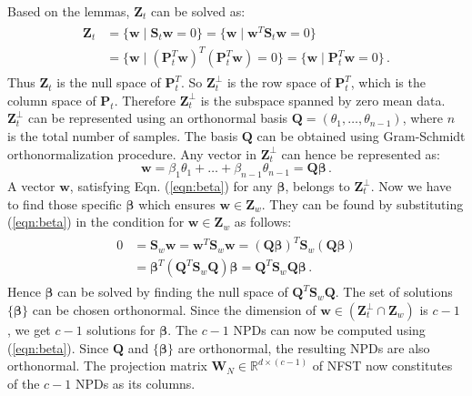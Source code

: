 \documentclass[runningheads]{llncs}
\begin{document}
Based on the lemmas, $\mathbf{Z}_t$ can be solved as:
\begin{eqnarray}
\begin{aligned}
\mathbf{Z}_t  &= \lbrace  \mathbf{w}  \; \vert \;  \mathbf{S}_t \mathbf{w} = 0\rbrace = \lbrace  \mathbf{w} \; \vert \;  \mathbf{w}^T \mathbf{S}_t \mathbf{w} = 0\rbrace \\
&= \lbrace  \mathbf{w} \; \vert \;  (\mathbf{P}_t^T \mathbf{w})^T (\mathbf{P}_t^T \mathbf{w})  = 0\rbrace = \lbrace  \mathbf{w} \; \vert \;  \mathbf{P}_t^T \mathbf{w}  = 0\rbrace \,.
\end{aligned}
\end{eqnarray}
Thus $\mathbf{Z}_t$ is the null space of $\mathbf{P}_t^T$. So $\mathbf{Z}^\perp_t$ is the row space of $\mathbf{P}_t^T$, which is the column space of $\mathbf{P}_t$. Therefore $\mathbf{Z}^\perp_t$ is the subspace spanned by zero mean data. $\mathbf{Z}^\perp_t$ can be represented using an orthonormal basis $\mathbf{Q} = (\theta_1,\ldots, \theta_{n-1})$, where $n$ is the total number of samples. The basis $\mathbf{Q}$ can be obtained using Gram-Schmidt orthonormalization procedure. Any vector in $\mathbf{Z}^\perp_t$ can hence be represented as: 
\begin{equation}
\label{eqn:beta}
\mathbf{w} = \beta_1 \theta_1 + \ldots + \beta_{n-1} \theta_{n-1} = \mathbf{Q}\bm{\beta}\,.
\end{equation}
A vector $\mathbf{w}$, satisfying Eqn. (\ref{eqn:beta}) for any $\bm{\beta}$, belongs to $\mathbf{Z}_t^\perp$.  Now we have to find those specific  $\bm{\beta}$ which ensures $\mathbf{w}\in \mathbf{Z}_w$. They can be found by substituting (\ref{eqn:beta}) in the condition for $\mathbf{w}\in \mathbf{Z}_w$ as follows:
\begin{eqnarray}
\begin{aligned}
0 &= \mathbf{S}_w \mathbf{w}  = \mathbf{w}^T \mathbf{S}_w \mathbf{w} = (\mathbf{Q\beta})^T \mathbf{S}_w (\mathbf{Q}\bm{\beta})\\
&= \bm{\beta}^T(\mathbf{Q}^T \mathbf{S}_w \mathbf{Q})\bm{\beta} = \mathbf{Q}^T \mathbf{S}_w \mathbf{Q}\bm{\beta}\,.
\end{aligned}
\end{eqnarray}
Hence $\bm{\beta}$ can be solved by finding the null space of $\mathbf{Q}^T \mathbf{S}_w \mathbf{Q}$. The set of solutions $\{\bm{\beta}\}$ can be chosen orthonormal. Since the dimension of $\mathbf{w} \in (\mathbf{Z}_t^\perp \cap \mathbf{Z}_w)$ is $c-1$ \cite{guo:nfst}, we get $c-1$ solutions for $\bm{\beta}$.  The $c-1$ NPDs can now be computed using (\ref{eqn:beta}). Since $\mathbf{Q}$ and $\{\bm{\beta}\}$ are orthonormal, the resulting NPDs are also orthonormal. The projection matrix $\mathbf{W}_N \in \mathbb{R}^{d \times (c-1)}$ of NFST now constitutes of the $c-1$ NPDs as its columns. 
\end{document}
